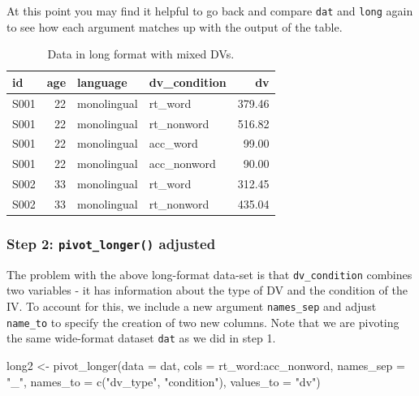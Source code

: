 \documentclass[
  english,
  doc,floatsintext]{apa6}
\newenvironment{Shaded}{\begin{snugshade}}{\end{snugshade}}
\newcommand{\AttributeTok}[1]{\textcolor[rgb]{0.77,0.63,0.00}{#1}}
\newcommand{\FunctionTok}[1]{\textcolor[rgb]{0.00,0.00,0.00}{#1}}
\newcommand{\NormalTok}[1]{#1}
\newcommand{\OtherTok}[1]{\textcolor[rgb]{0.56,0.35,0.01}{#1}}
\newcommand{\SpecialCharTok}[1]{\textcolor[rgb]{0.00,0.00,0.00}{#1}}
\newcommand{\StringTok}[1]{\textcolor[rgb]{0.31,0.60,0.02}{#1}}
\begin{document}
At this point you may find it helpful to go back and compare \texttt{dat} and \texttt{long} again to see how each argument matches up with the output of the table.

\begin{table}

\caption{\label{tab:long1-example}Data in long format with mixed DVs.}
\centering
\begin{tabular}[t]{l|r|l|l|r}
\hline
id & age & language & dv\_condition & dv\\
\hline
S001 & 22 & monolingual & rt\_word & 379.46\\
\hline
S001 & 22 & monolingual & rt\_nonword & 516.82\\
\hline
S001 & 22 & monolingual & acc\_word & 99.00\\
\hline
S001 & 22 & monolingual & acc\_nonword & 90.00\\
\hline
S002 & 33 & monolingual & rt\_word & 312.45\\
\hline
S002 & 33 & monolingual & rt\_nonword & 435.04\\
\hline
\end{tabular}
\end{table}

\hypertarget{step-2-pivot_longer-adjusted}{%
\subsubsection{\texorpdfstring{Step 2: \texttt{pivot\_longer()} adjusted}{Step 2: pivot\_longer() adjusted}}\label{step-2-pivot_longer-adjusted}}

The problem with the above long-format data-set is that \texttt{dv\_condition} combines two variables - it has information about the type of DV and the condition of the IV. To account for this, we include a new argument \texttt{names\_sep} and adjust \texttt{name\_to} to specify the creation of two new columns. Note that we are pivoting the same wide-format dataset \texttt{dat} as we did in step 1.

\begin{Shaded}
\begin{Highlighting}[]
\NormalTok{long2 }\OtherTok{\textless{}{-}} \FunctionTok{pivot\_longer}\NormalTok{(}\AttributeTok{data =}\NormalTok{ dat, }
                     \AttributeTok{cols =}\NormalTok{ rt\_word}\SpecialCharTok{:}\NormalTok{acc\_nonword, }
                     \AttributeTok{names\_sep =} \StringTok{"\_"}\NormalTok{, }
                     \AttributeTok{names\_to =} \FunctionTok{c}\NormalTok{(}\StringTok{"dv\_type"}\NormalTok{, }\StringTok{"condition"}\NormalTok{),}
                     \AttributeTok{values\_to =} \StringTok{"dv"}\NormalTok{)}
\end{Highlighting}
\end{Shaded}
\end{document}
